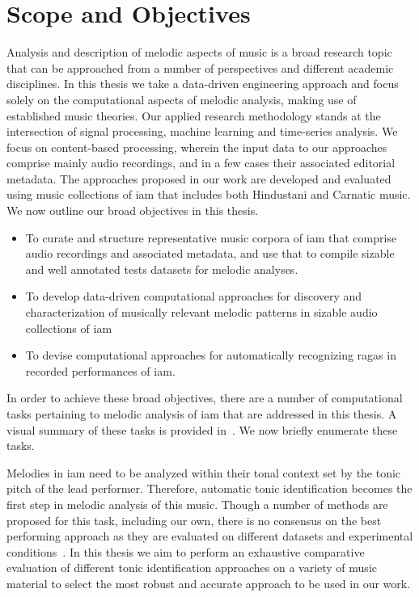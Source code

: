 \section{Scope and Objectives}
\label{sec:scope_objectives}

Analysis and description of melodic aspects of music is a broad research topic that can be approached from a number of perspectives and different academic disciplines. In this thesis we take a data-driven engineering approach and focus solely on the computational aspects of melodic analysis, making use of established music theories. Our applied research methodology stands at the intersection of signal processing, machine learning and time-series analysis. We focus on content-based processing, wherein the input data to our approaches comprise mainly audio recordings, and in a few cases their associated editorial metadata. The approaches proposed in our work are developed and evaluated using music collections of \gls{iam} that includes both Hindustani and Carnatic music. We now outline our broad objectives in this thesis.

\begin{itemize}
	\item To curate and structure representative music corpora of \gls{iam} that comprise audio recordings and associated metadata, and use that to compile sizable and well annotated tests datasets for melodic analyses.
	\item To develop data-driven computational approaches for discovery and characterization of musically relevant melodic patterns in sizable audio collections of \gls{iam}
	\item To devise computational approaches for automatically recognizing \glspl{raga} in recorded performances of \gls{iam}.
\end{itemize}

In order to achieve these broad objectives, there are a number of computational tasks pertaining to melodic analysis of \gls{iam} that are addressed in this thesis. A visual summary of these tasks is provided in~. We now briefly enumerate these tasks.

Melodies in \gls{iam} need to be analyzed within their tonal context set by the tonic pitch of the lead performer. Therefore, automatic tonic identification becomes the first step in melodic analysis of this music. Though a number of methods are proposed for this task, including our own, there is no consensus on the best performing approach as they are evaluated on different datasets and experimental conditions~\citep{Gulati2014Tonic}. In this thesis we aim to perform an exhaustive comparative evaluation of different tonic identification approaches on a variety of music material to select the most robust and accurate approach to be used in our work. 

